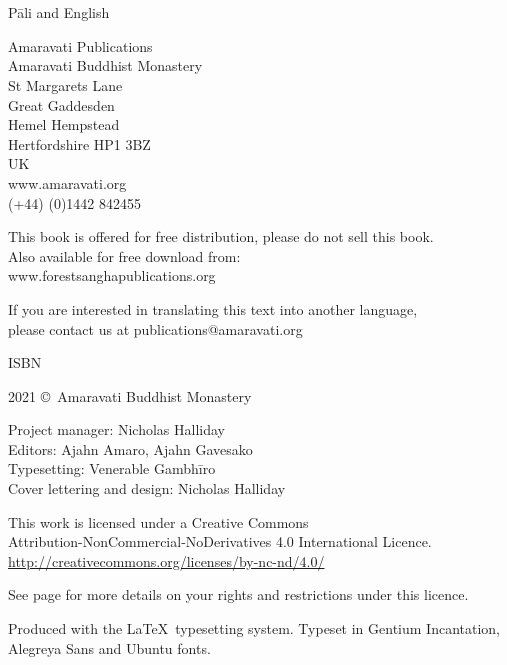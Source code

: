 
\thispagestyle{empty}

\resumeNormalText

\enlargethispage{\baselineskip}

{\centering
\ifaivedition
\fontsize{12}{15}\selectfont
\else
\small
\fi
\setlength{\parskip}{15pt}

{\normalsize
\thetitle\\
\thesubtitle\\
Pāli and English}

Amaravati Publications\\
Amaravati Buddhist Monastery\\
St Margarets Lane\\
Great Gaddesden\\
Hemel Hempstead\\
Hertfordshire HP1 3BZ\\
UK\\
www.amaravati.org\\
(+44) (0)1442 842455

This book is offered for free distribution, please do not sell this book.\\
Also available for free download from:\\
www.forestsanghapublications.org

If you are interested in translating this text into another language,\\
please contact us at publications@amaravati.org

ISBN \theISBN

2021 \copyright\ Amaravati Buddhist Monastery

Project manager: Nicholas Halliday\\
Editors: Ajahn Amaro, Ajahn Gavesako\\
Typesetting: Venerable Gambhīro\\
Cover lettering and design: Nicholas Halliday

\vfill

This work is licensed under a Creative Commons\\
Attribution-NonCommercial-NoDerivatives 4.0 International Licence.\\
\href{http://creativecommons.org/licenses/by-nc-nd/4.0/}{http://creativecommons.org/licenses/by-nc-nd/4.0/}

See page \pageref{copyright-details} for more details on your rights and restrictions under this licence.

Produced with the \LaTeX\ typesetting system. Typeset in Gentium Incantation,\\
Alegreya Sans and Ubuntu fonts.

\theEditionInfo


}

\thaiText


